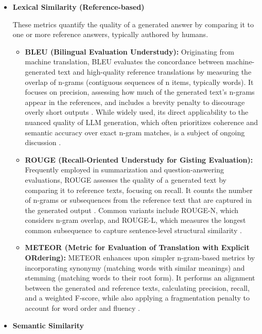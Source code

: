 \documentclass[12pt]{report}
\begin{document}
\begin{itemize}
  
  \item \textbf{Lexical Similarity (Reference-based)}

  These metrics quantify the quality of a generated answer by comparing it to one or more reference answers, typically authored by humans.

  \begin{itemize}
      \item \textbf{BLEU (Bilingual Evaluation Understudy):} Originating from machine translation, BLEU evaluates the concordance between machine-generated text and high-quality reference translations by measuring the overlap of n-grams (contiguous sequences of n items, typically words). It focuses on precision, assessing how much of the generated text's n-grams appear in the references, and includes a brevity penalty to discourage overly short outputs \cite{Papineni2002BLEU}. While widely used, its direct applicability to the nuanced quality of LLM generation, which often prioritizes coherence and semantic accuracy over exact n-gram matches, is a subject of ongoing discussion \cite{PremAI2024LLMEvalPart1}.

      \item \textbf{ROUGE (Recall-Oriented Understudy for Gisting Evaluation):} Frequently employed in summarization and question-answering evaluations, ROUGE assesses the quality of a generated text by comparing it to reference texts, focusing on recall. It counts the number of n-grams or subsequences from the reference text that are captured in the generated output \cite{Lin2004ROUGE}. Common variants include ROUGE-N, which considers n-gram overlap, and ROUGE-L, which measures the longest common subsequence to capture sentence-level structural similarity \cite{GalileoAI2025ROUGEMetric}.

      \item \textbf{METEOR (Metric for Evaluation of Translation with Explicit ORdering):} METEOR enhances upon simpler n-gram-based metrics by incorporating synonymy (matching words with similar meanings) and stemming (matching words to their root form). It performs an alignment between the generated and reference texts, calculating precision, recall, and a weighted F-score, while also applying a fragmentation penalty to account for word order and fluency \cite{Banerjee2005METEOR, AnalyticsVidhya2025Meteor}.
  \end{itemize}

  \item \textbf{Semantic Similarity}


\end{itemize}
\end{document}

